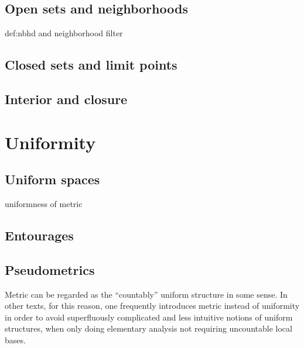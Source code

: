 \documentclass{../crs}
\begin{document}
\subsection{Open sets and neighborhoods}
def:nbhd and neighborhood filter


\subsection{Closed sets and limit points}

\subsection{Interior and closure}




























\section{Uniformity}

\subsection{Uniform spaces}
uniformness of metric


\subsection{Entourages}



\subsection{Pseudometrics}

Metric can be regarded as the ``countably'' uniform structure in some sense. 
In other texts, for this reason, one frequently introduces metric instead of uniformity in order to avoid superfluously complicated and less intuitive notions of uniform structures, when only doing elementary analysis not requiring uncountable local bases.
\end{document}
